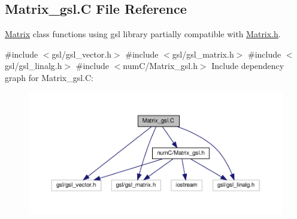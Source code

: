 \hypertarget{Matrix__gsl_8C}{}\subsection{Matrix\+\_\+gsl.\+C File Reference}
\label{Matrix__gsl_8C}


\hyperlink{classMatrix}{Matrix} class functions using gsl library partially compatible with \hyperlink{Matrix_8h}{Matrix.\+h}.  


{\ttfamily \#include $<$gsl/gsl\+\_\+vector.\+h$>$}\newline
{\ttfamily \#include $<$gsl/gsl\+\_\+matrix.\+h$>$}\newline
{\ttfamily \#include $<$gsl/gsl\+\_\+linalg.\+h$>$}\newline
{\ttfamily \#include $<$num\+C/\+Matrix\+\_\+gsl.\+h$>$}\newline
Include dependency graph for Matrix\+\_\+gsl.\+C\+:\nopagebreak
\begin{figure}[H]
\begin{center}
\leavevmode
\includegraphics[width=350pt]{Matrix__gsl_8C__incl}
\end{center}
\end{figure}
